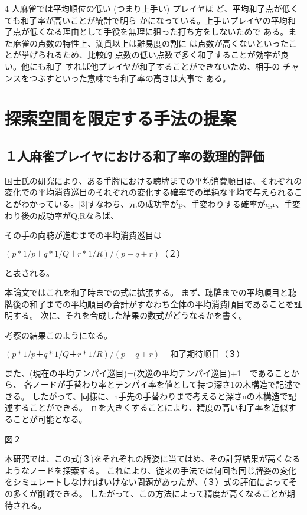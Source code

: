 4 人麻雀では平均順位の低い (つまり上手い) プレイヤほ ど、平均和了点が低くても和了率が高いことが統計で明ら かになっている\cite{kagaku}。上手いプレイヤの平均和了点が低くなる理由として手役を無理に狙った打ち方をしないためで
ある。また麻雀の点数の特性上、満貫以上は難易度の割に
は点数が高くないといったことが挙げられるため、比較的
点数の低い点数で゙多く和了することが効率が良い。他にも和了
すれば他プレイヤが和了することができないため、相手の
チャンスをつぶすといった意味でも和了率の高さは大事で
ある。

\section{探索空間を限定する手法の提案}
\subsection{１人麻雀プレイヤにおける和了率の数理的評価}

国士氏の研究により、ある手牌における聴牌までの平均消費順目は、それぞれの変化での平均消費巡目のそれぞれの変化する確率での単純な平均で与えられることがわかっている。[3]すなわち、元の成功率がp、手変わりする確率がq,r、手変わり後の成功率がQ,Rならば、

その手の向聴が進むまでの平均消費巡目は

$(p * 1/p ＋ q * 1/Q ＋ r * 1/R) / (p+q+r)　（２）$

と表される。

本論文ではこれを和了時までの式に拡張する。
まず、聴牌までの平均順目と聴牌後の和了までの平均順目の合計がすなわち全体の平均消費順目であることを証明する。
次に、それを合成した結果の数式がどうなるかを書く。

考察の結果このようになる。

$(p * 1/p ＋ q * 1/Q ＋ r * 1/R) / (p+q+r)　+ 和了期待順目　（３）$

また、(現在の平均テンパイ巡目)=(次巡の平均テンパイ巡目)+1　であることから、
各ノードが手替わり率とテンパイ率を値として持つ深さ1の木構造で記述できる。 
したがって、同様に、n手先の手替わりまで考えると深さnの木構造で記述することができる。
ｎを大きくすることにより、精度の高い和了率を近似することが可能となる。

図２

本研究では、この式(３)をそれぞれの牌姿に当てはめ、その計算結果が高くなるようなノードを探索する。
これにより、従来の手法では何回も同じ牌姿の変化をシミュレートしなければいけない問題があったが、（３）式の評価によってその多くが削減できる。
したがって、この方法によって精度が高くなることが期待される。

